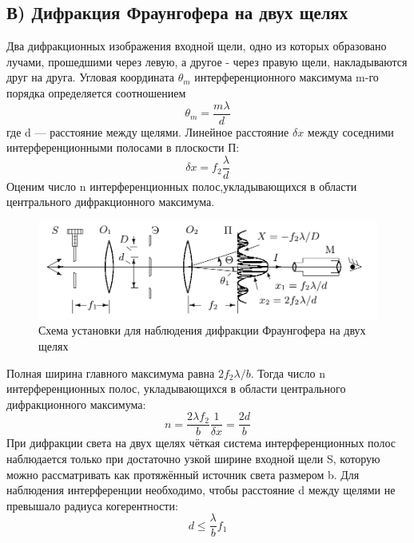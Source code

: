 \subsection*{В) Дифракция Фраунгофера на двух щелях}
\indent
Два дифракционных изображения входной щели, одно из которых образовано лучами, прошедшими через левую, а другое - через правую щели, накладываются друг на друга.
Угловая координата $\theta_m$ интерференционного максимума m-го порядка определяется соотношением
\begin{equation}
    \theta_m = \frac{m\lambda}{d}
\end{equation}
где d — расстояние между щелями. Линейное расстояние $\delta x$ между соседними интерференционными полосами в плоскости П:
\begin{equation}
    \delta x = f_2\frac{\lambda}{d} \label{eq:fraunogofer2_1}
\end{equation}
Оценим число n интерференционных полос,укладывающихся в области центрального дифракционного максимума.
\newpage
\begin{figure}
    \centering
    \includegraphics[width=14cm]{images/fraungofer_3.png}
    \caption{Схема установки для наблюдения дифракции Фраунгофера на двух щелях}
\end{figure}

Полная ширина главного максимума равна $2f_2\lambda / b$. Тогда число n интерференционных полос,
укладывающихся в области центрального дифракционного максимума:
\begin{equation}
    n =\frac{2\lambda f_2}{b}\frac{1}{\delta x} = \frac{2d}{b}\label{eq:fraunogofer2_2}
\end{equation}
\indent
При дифракции света на двух щелях чёткая система интерференционных полос наблюдается только при достаточно узкой ширине входной щели S, которую можно рассматривать как протяжённый источник света размером b. Для наблюдения интерференции необходимо, чтобы
расстояние d между щелями не превышало радиуса когерентности:
\begin{equation}
    d \le \frac{\lambda}{b}f_1
\end{equation}

